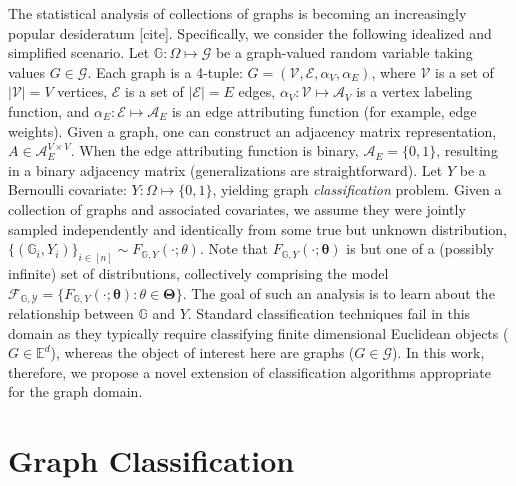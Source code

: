 \documentclass{article} %
\providecommand{\ve}[1]{\boldsymbol{#1}}
\newcommand{\EE}{\mathbb{E}}           %
\newcommand{\bth}{\ve{\theta}}
\newcommand{\bTh}{\ve{\Theta}}
\providecommand{\mc}[1]{\mathcal{#1}}
\newcommand{\GG}{\mathbb{G}}
\begin{document}
The statistical analysis of collections of graphs is becoming an increasingly popular desideratum [cite].  Specifically, we consider the following idealized and simplified scenario. Let $\GG: \Omega \mapsto \mc{G}$ be a graph-valued random variable taking values $G\in \mc{G}$. Each graph is a 4-tuple: $G=(\mc{V},\mc{E},\alpha_V,\alpha_E)$, where $\mc{V}$ is a set of $|\mc{V}|=V$ vertices, $\mc{E}$ is a set of $|\mc{E}|=E$ edges, $\alpha_V: \mc{V} \mapsto \mc{A}_V$ is a vertex labeling function, and $\alpha_E: \mc{E} \mapsto \mc{A}_E$ is an edge attributing function (for example, edge weights).  Given a graph, one can construct an adjacency matrix representation, $A \in \mc{A}_E^{V \times V}$.  When the edge attributing function is binary, $\mc{A}_E=\{0,1\}$, resulting in a binary adjacency matrix (generalizations are straightforward).  Let $Y$ be a Bernoulli covariate: $Y: \Omega \mapsto \{0,1\}$, yielding graph \emph{classification} problem.  Given a collection of graphs and associated covariates,  we assume they were jointly sampled independently and identically from some true but unknown distribution, $\{(\GG_i,Y_i)\}_{i \in [n]} \sim F_{\GG,Y}(\cdot; \theta)$.  Note that $F_{\GG,Y}(\cdot; \bth)$ is but one of a (possibly infinite) set of distributions, collectively comprising the model $\mc{F_{\GG,Y}}=\{F_{\GG,Y}(\cdot; \bth) : \theta \in \bTh\}$.  The goal of such an analysis is to learn about the relationship between $\GG$ and $Y$.   Standard classification techniques fail in this domain as they typically require classifying finite dimensional Euclidean objects ($G \in \EE^d$), whereas the object of interest here are graphs ($G \in \mc{G}$).   In this work, therefore, we propose a novel extension of classification algorithms appropriate for the graph domain.



\section{Graph Classification} %
\label{sec:graph_classification}
\end{document}
